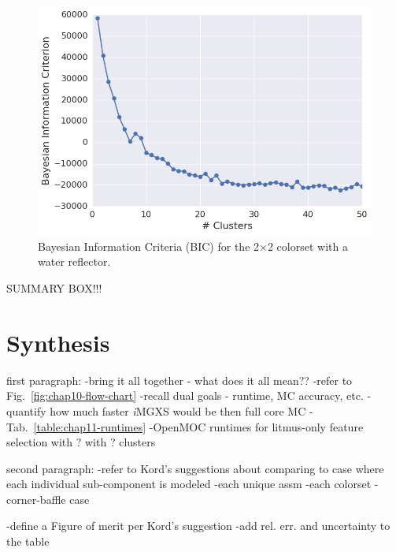 \begin{figure}[h!]
\centering
\includegraphics[width=0.87\linewidth]{figures/results/model-select/reflector/bic-combined-U238-nu-fission-1}
\vspace{2mm}
\caption[BIC for the 2$\times$2 colorset with reflector]{Bayesian Information Criteria (BIC) for the 2$\times$2 colorset with a water reflector.}
\label{fig:chap11-refl-bic}
\end{figure}

SUMMARY BOX!!!

\section{Synthesis}
\label{sec:chap11-synthesis}

first paragraph:
-bring it all together - what does it all mean??
  -refer to Fig.~\ref{fig:chap10-flow-chart}
  -recall dual goals - runtime, MC accuracy, etc.
-quantify how much faster \textit{i}\ac{MGXS} would be then full core MC
  -Tab.~\ref{table:chap11-runtimes}
-OpenMOC runtimes for litmus-only feature selection with ? with ? clusters

second paragraph:
-refer to Kord's suggestions about comparing to case where each individual sub-component is modeled
 -each unique assm
 -each colorset
 -corner-baffle case

-define a Figure of merit per Kord's suggestion
-add rel. err. and uncertainty to the table


